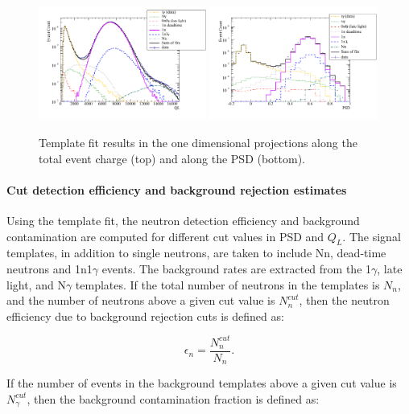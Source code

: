 \documentclass[review]{elsarticle}
\begin{document}
\begin{figure}[!htpb]
\centering 
\includegraphics[width = 0.49\textwidth] {figures/qlfit.pdf} 
\includegraphics[width = 0.49\textwidth] {figures/psdfit.pdf}  
\caption{ Template fit results in the one dimensional projections
  along the total event charge (top) and along the PSD (bottom).}
\label{fig:fits}
\end{figure}


\paragraph{Cut detection efficiency and background rejection estimates}

Using the template fit, the neutron detection efficiency and
background contamination are computed for different cut values in PSD
and $Q_L$.  The signal templates, in addition to single neutrons, are
taken to include Nn, dead-time neutrons and 1n1$\gamma$ events.  The
background rates are extracted from the 1$\gamma$, late light, and
N$\gamma$ templates.  If the total number of neutrons in the templates
is $N_n$, and the number of neutrons above a given cut value is
$N_n^{cut}$, then the neutron efficiency due to background rejection
cuts is defined as:

\begin{equation}
\epsilon_n = \frac{N_n^{cut}}{N_n}.
\end{equation}

\noindent If the number of events in the background templates above a
given cut value is $N_{\gamma}^{cut}$, then the background
contamination fraction is defined as:
\end{document}
